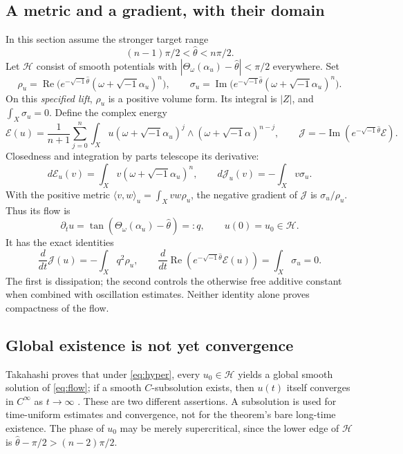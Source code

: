 \documentclass[12pt,reqno]{amsart}
\newcommand{\ii}{\sqrt{-1}}
\newcommand{\Th}{\Theta_\omega}
\newcommand{\hth}{\widehat\theta}
\newcommand{\Ree}{\operatorname{Re}}
\newcommand{\Imm}{\operatorname{Im}}
\begin{document}
\subsection{A metric and a gradient, with their domain}
In this section assume the stronger target range
\begin{equation}\label{eq:hyper}
 (n-1)\pi/2<\hth<n\pi/2.
\end{equation}
Let $\mathcal H$ consist of smooth potentials with $|\Th(\alpha_u)-\hth|<\pi/2$ everywhere. Set
\[
 \rho_u=\Ree\bigl(e^{-\ii\hth}(\omega+\ii\alpha_u)^n\bigr),\qquad
 \sigma_u=\Imm\bigl(e^{-\ii\hth}(\omega+\ii\alpha_u)^n\bigr).
\]
On this \emph{specified lift}, $\rho_u$ is a positive volume form. Its integral is $|Z|$, and $\int_X\sigma_u=0$. Define the complex energy
\[
 \mathcal E(u)=\frac1{n+1}\sum_{j=0}^n
       \int_X u(\omega+\ii\alpha_u)^j\wedge(\omega+\ii\alpha)^{n-j},
 \qquad \mathcal J=-\Imm(e^{-\ii\hth}\mathcal E).
\]
Closedness and integration by parts telescope its derivative:
\begin{equation}\label{eq:variation}
 d\mathcal E_u(v)=\int_Xv(\omega+\ii\alpha_u)^n,
 \qquad d\mathcal J_u(v)=-\int_Xv\sigma_u.
\end{equation}
With the positive metric $\langle v,w\rangle_u=\int_Xvw\rho_u$, the negative gradient of $\mathcal J$ is $\sigma_u/\rho_u$. Thus its flow is
\begin{equation}\label{eq:flow}
 \partial_tu=\tan(\Th(\alpha_u)-\hth)=:q,
 \qquad u(0)=u_0\in\mathcal H.
\end{equation}
It has the exact identities
\begin{equation}\label{eq:dissipation}
 \frac{d}{dt}\mathcal J(u)=-\int_Xq^2\rho_u,
 \qquad
 \frac{d}{dt}\Ree(e^{-\ii\hth}\mathcal E(u))=\int_X\sigma_u=0.
\end{equation}
The first is dissipation; the second controls the otherwise free additive constant when combined with oscillation estimates. Neither identity alone proves compactness of the flow.

\subsection{Global existence is not yet convergence}
Takahashi proves that under \eqref{eq:hyper}, every $u_0\in\mathcal H$ yields a global smooth solution of \eqref{eq:flow}; if a smooth $C$-subsolution exists, then $u(t)$ itself converges in $C^\infty$ as $t\to\infty$ \cite[Theorem 1.4]{Tak}. These are two different assertions. A subsolution is used for time-uniform estimates and convergence, not for the theorem's bare long-time existence. The phase of $u_0$ may be merely supercritical, since the lower edge of $\mathcal H$ is $\hth-\pi/2>(n-2)\pi/2$.
\end{document}
